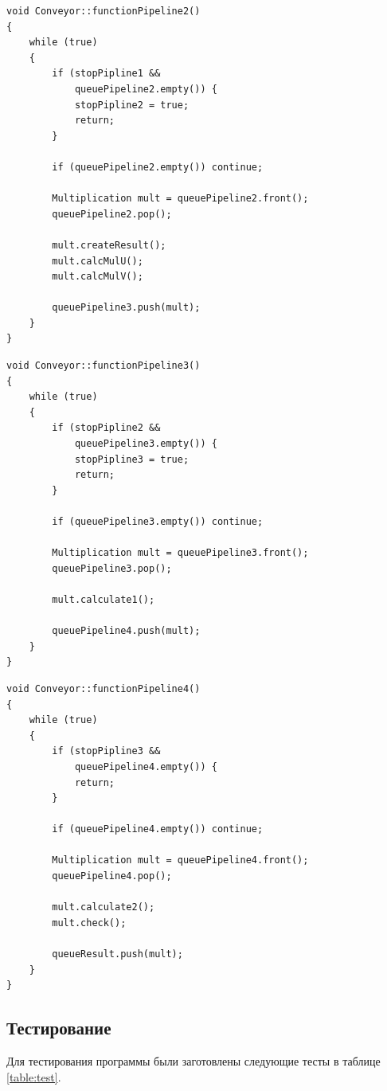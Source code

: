 \documentclass[a4paper,12pt]{article}
\begin{document}
\begin{lstlisting}[caption=Второй конвейер,label=lst:pipeline2]
void Conveyor::functionPipeline2()
{
    while (true)
    {
        if (stopPipline1 &&
            queuePipeline2.empty()) {
            stopPipline2 = true;
            return;
        }

        if (queuePipeline2.empty()) continue;

        Multiplication mult = queuePipeline2.front();
        queuePipeline2.pop();

        mult.createResult();
        mult.calcMulU();
        mult.calcMulV();

        queuePipeline3.push(mult);
    }
}
\end{lstlisting}

\begin{lstlisting}[caption=Третий конвейер,label=lst:pipeline3]
void Conveyor::functionPipeline3()
{
    while (true)
    {
        if (stopPipline2 &&
            queuePipeline3.empty()) {
            stopPipline3 = true;
            return;
        }

        if (queuePipeline3.empty()) continue;

        Multiplication mult = queuePipeline3.front();
        queuePipeline3.pop();

        mult.calculate1();

        queuePipeline4.push(mult);
    }
}
\end{lstlisting}

\begin{lstlisting}[caption=Четвертый конвейер,label=lst:pipeline4]
void Conveyor::functionPipeline4()
{
    while (true)
    {
        if (stopPipline3 &&
            queuePipeline4.empty()) {
            return;
        }

        if (queuePipeline4.empty()) continue;

        Multiplication mult = queuePipeline4.front();
        queuePipeline4.pop();

        mult.calculate2();
        mult.check();

        queueResult.push(mult);
    }
}
\end{lstlisting}

\subsection{Тестирование}

Для тестирования программы были заготовлены следующие тесты в таблице
\ref{table:test}.
\end{document}
